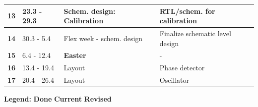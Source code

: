 \documentclass[t, screen, aspectratio=43]{beamer}
\begin{document}
\begin{frame}
\begin{table}[htb!]
\begin{tabular}{|c|l|l|l|}
			\hline 
			\rule[-1ex]{0pt}{2.5ex}\textbf{13}&23.3 - 29.3&Schem. design: Calibration& RTL/schem. for calibration\\ 
			\hline 
			\rule[-1ex]{0pt}{2.5ex}\textbf{14}& 30.3 - 5.4 &  Flex week - schem. design & Finalize schematic level design\\ 
			\hline 
			\rule[-1ex]{0pt}{2.5ex}\textbf{15}& 6.4 - 12.4& {\color{red}\textbf{Easter}} & - \\ 
			\hline 
			\rule[-1ex]{0pt}{2.5ex}\textbf{16}& 13.4 - 19.4& Layout & Phase detector\\ 
			\hline 
			\rule[-1ex]{0pt}{2.5ex}\textbf{17}& 20.4 - 26.4& Layout & Oscillator\\ 
			\hline 
		\end{tabular}
		\begin{flushleft}\textbf{Legend:} \colorbox{red!20}{\textbf{Done}} \colorbox{green!20}{\textbf{Current}}  \colorbox{blue!20}{\textbf{Revised}}
		\end{flushleft}
	\end{table}   
\end{frame}
\end{document}
